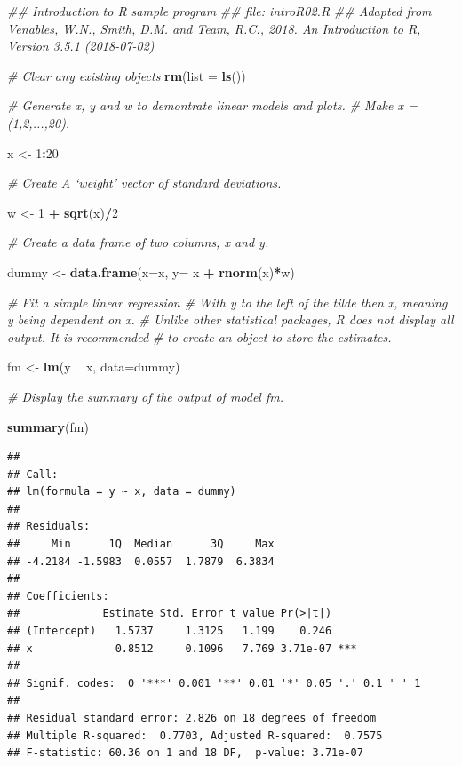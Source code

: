 \documentclass[]{book}
\newenvironment{Shaded}{\begin{snugshade}}{\end{snugshade}}
\newcommand{\CommentTok}[1]{\textcolor[rgb]{0.56,0.35,0.01}{\textit{#1}}}
\newcommand{\DataTypeTok}[1]{\textcolor[rgb]{0.13,0.29,0.53}{#1}}
\newcommand{\DecValTok}[1]{\textcolor[rgb]{0.00,0.00,0.81}{#1}}
\newcommand{\KeywordTok}[1]{\textcolor[rgb]{0.13,0.29,0.53}{\textbf{#1}}}
\newcommand{\NormalTok}[1]{#1}
\newcommand{\OperatorTok}[1]{\textcolor[rgb]{0.81,0.36,0.00}{\textbf{#1}}}
\newcommand{\StringTok}[1]{\textcolor[rgb]{0.31,0.60,0.02}{#1}}
\begin{document}
\begin{Shaded}
\begin{Highlighting}[]
\CommentTok{## Introduction to R sample program }
\CommentTok{## file: introR02.R}
\CommentTok{## Adapted from Venables, W.N., Smith, D.M. and Team, R.C., 2018. An Introduction to R, Version 3.5.1 (2018-07-02)}


\CommentTok{# Clear any existing objects }
\KeywordTok{rm}\NormalTok{(}\DataTypeTok{list =} \KeywordTok{ls}\NormalTok{())}

\CommentTok{# Generate x, y and w to demontrate linear models and plots.}
\CommentTok{# Make x = (1,2,...,20).}

\NormalTok{x <-}\StringTok{ }\DecValTok{1}\OperatorTok{:}\DecValTok{20}

\CommentTok{# Create A ‘weight’ vector of standard deviations.}

\NormalTok{w <-}\StringTok{ }\DecValTok{1} \OperatorTok{+}\StringTok{ }\KeywordTok{sqrt}\NormalTok{(x)}\OperatorTok{/}\DecValTok{2}

\CommentTok{# Create a data frame of two columns, x and y.}

\NormalTok{dummy <-}\StringTok{ }\KeywordTok{data.frame}\NormalTok{(}\DataTypeTok{x=}\NormalTok{x, }\DataTypeTok{y=}\NormalTok{ x }\OperatorTok{+}\StringTok{ }\KeywordTok{rnorm}\NormalTok{(x)}\OperatorTok{*}\NormalTok{w)}

\CommentTok{# Fit a simple linear regression }
\CommentTok{# With y to the left of the tilde then x, meaning y being dependent on x.}
\CommentTok{# Unlike other statistical packages, R does not display all output.  It is recommended}
\CommentTok{# to create an object to store the estimates.}

\NormalTok{fm <-}\StringTok{ }\KeywordTok{lm}\NormalTok{(y }\OperatorTok{~}\StringTok{ }\NormalTok{x, }\DataTypeTok{data=}\NormalTok{dummy) }

\CommentTok{# Display the summary of the output of model fm.}

\KeywordTok{summary}\NormalTok{(fm)}
\end{Highlighting}
\end{Shaded}

\begin{verbatim}
## 
## Call:
## lm(formula = y ~ x, data = dummy)
## 
## Residuals:
##     Min      1Q  Median      3Q     Max 
## -4.2184 -1.5983  0.0557  1.7879  6.3834 
## 
## Coefficients:
##             Estimate Std. Error t value Pr(>|t|)    
## (Intercept)   1.5737     1.3125   1.199    0.246    
## x             0.8512     0.1096   7.769 3.71e-07 ***
## ---
## Signif. codes:  0 '***' 0.001 '**' 0.01 '*' 0.05 '.' 0.1 ' ' 1
## 
## Residual standard error: 2.826 on 18 degrees of freedom
## Multiple R-squared:  0.7703, Adjusted R-squared:  0.7575 
## F-statistic: 60.36 on 1 and 18 DF,  p-value: 3.71e-07
\end{verbatim}
\end{document}
